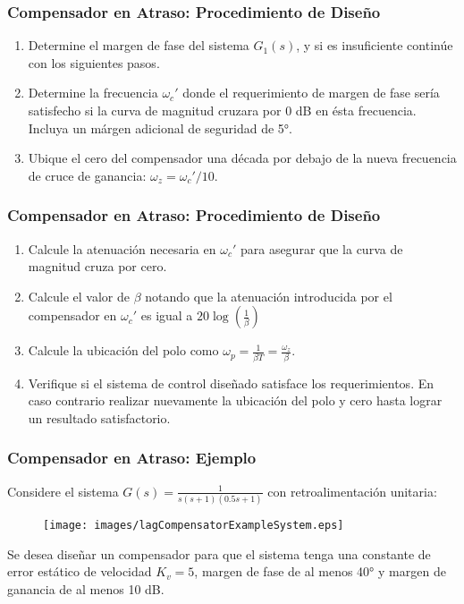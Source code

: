 \documentclass[aspectratio=169, handout]{beamer}
\theoremstyle{definition}
\theoremstyle{plain}
\theoremstyle{remark}
\newcounter{saveenumi}
\newcommand{\seti}{\setcounter{saveenumi}{\value{enumi}}}
\newcommand{\conti}{\setcounter{enumi}{\value{saveenumi}}}
\begin{document}
\begin{frame}[<+->]\frametitle{Compensador en Atraso: Procedimiento de Diseño}
	\begin{enumerate}
		\conti
		\item Determine el margen de fase del sistema $G_1(s)$, y si es insuficiente continúe con los siguientes pasos.
		\item Determine la frecuencia $\omega_c'$ donde el requerimiento de margen de fase sería satisfecho si la curva de magnitud cruzara por 0 dB en ésta frecuencia. Incluya un márgen adicional de seguridad de \ang{5}.
		\item Ubique el cero del compensador una década por debajo de la nueva frecuencia de cruce de ganancia: $\omega_z = \omega_c'/10$.
		\seti
	\end{enumerate}
\end{frame}

\begin{frame}[<+->]\frametitle{Compensador en Atraso: Procedimiento de Diseño}
	\begin{enumerate}
		\conti
		\item Calcule la atenuación necesaria en $\omega_c'$ para asegurar que la curva de magnitud cruza por cero.
		\item Calcule el valor de $\beta$ notando que la atenuación introducida por el compensador en $\omega_c'$ es igual a $20 \log \left(\frac{1}{\beta} \right)$
		\item Calcule la ubicación del polo como $\omega_p = \frac{1}{\beta T} = \frac{\omega_z}{\beta}$.
		\item Verifique si el sistema de control diseñado satisface los requerimientos. En caso contrario realizar nuevamente la ubicación del polo y cero hasta lograr un resultado satisfactorio.
		\seti
	\end{enumerate}
\end{frame}

\begin{frame}[<+->]\frametitle{Compensador en Atraso: Ejemplo}
	Considere el sistema $G(s) = \frac{1}{s(s+1)(0.5s+1)}$ con retroalimentación unitaria:
	\begin{figure}
		\centering
		\texttt{[image: images/lagCompensatorExampleSystem.eps]}
	\end{figure}
	Se desea diseñar un compensador para que el sistema tenga una constante de error estático de velocidad $K_v = 5$, margen de fase de al menos \ang{40} y margen de ganancia de al menos 10 dB.
\end{frame}
\end{document}
